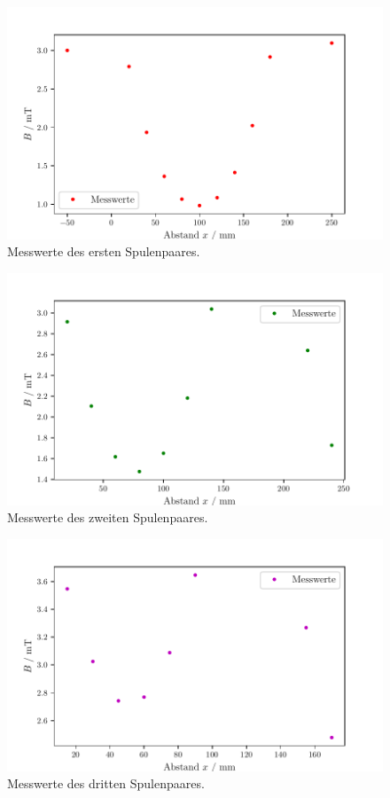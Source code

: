 \begin{figure}
  \centering
  \includegraphics{Spulenpaar1.pdf}
  \caption{Messwerte des ersten Spulenpaares.}
  \label{fig:Spulenpaar1}
\end{figure}




\begin{figure}
  \centering
  \includegraphics{Spulenpaar2.pdf}
  \caption{Messwerte des zweiten Spulenpaares.}
  \label{fig:Spulenpaar2}
\end{figure}


\begin{figure}
  \centering

  \includegraphics{Spulenpaar3.pdf}
  \caption{Messwerte des dritten Spulenpaares.}
  \label{fig:Spulenpaar3}
\end{figure}



